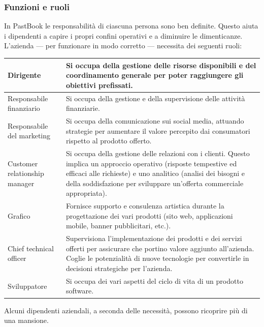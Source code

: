 			\subsubsection{Funzioni e ruoli}
				In PastBook le responsabilità di ciascuna persona sono ben definite. Questo aiuta i dipendenti a capire i propri
				confini operativi e a diminuire le dimenticanze.\\
				L'azienda — per funzionare in modo corretto — necessita dei seguenti ruoli:
				\begin{center}
					\begin{tabular}[H]{p{} p{}}
						Dirigente 			& Si occupa della gestione delle risorse disponibili e del
										  coordinamento generale per poter raggiungere gli obiettivi
										  prefissati.\\
						\hline
						Responsabile finanziario	& Si occupa della gestione e della supervisione delle attività
										  finanziarie.\\
						\hline
						Responsabile del marketing	& Si occupa della comunicazione sui social media, attuando strategie
										  per aumentare il valore percepito dai consumatori rispetto al
										  prodotto offerto.\\
						\hline
						Customer relationship manager	& Si occupa della gestione delle relazioni con i clienti. Questo
										  implica un approccio operativo (risposte tempestive ed efficaci
										  alle richieste) e uno analitico (analisi dei bisogni e della
										  soddisfazione per sviluppare un'offerta commerciale appropriata).\\
						\hline
						Grafico				& Fornisce supporto e consulenza artistica durante la progettazione
										  dei vari prodotti (sito web, applicazioni mobile, banner
										  pubblicitari, etc.).\\
						\hline
						Chief technical officer		& Supervisiona l'implementazione dei prodotti e dei servizi offerti
										  per assicurare che portino valore aggiunto all'azienda. Coglie le
										  potenzialità di nuove tecnologie per convertirle in decisioni
										  strategiche per l'azienda.\\
						\hline
						Sviluppatore 			& Si occupa dei vari aspetti del ciclo di vita di un prodotto
										  software.\\
					\end{tabular}
				\end{center}
				Alcuni dipendenti aziendali, a seconda delle necessità, possono ricoprire più di una mansione.

